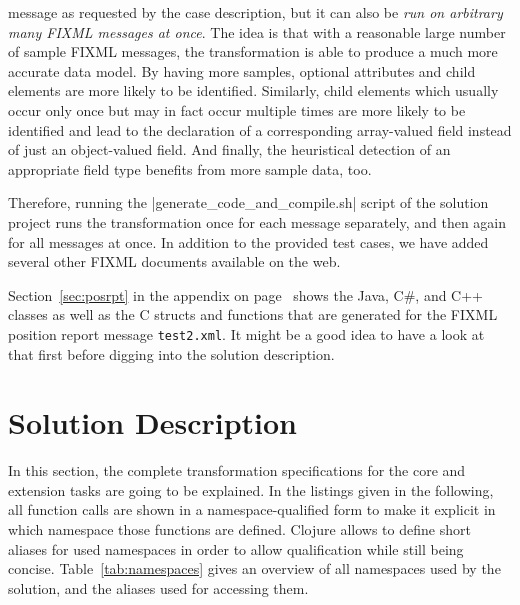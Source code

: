 \documentclass[a4paper]{article}
\newcommand{\code}{\clojureinline}
\begin{document}
\begin{compactenum}
  message as requested by the case description, but it can also be \emph{run on
    arbitrary many FIXML messages at once}.  The idea is that with a reasonable
  large number of sample FIXML messages, the transformation is able to produce
  a much more accurate data model.  By having more samples, optional attributes
  and child elements are more likely to be identified.  Similarly, child
  elements which usually occur only once but may in fact occur multiple times
  are more likely to be identified and lead to the declaration of a
  corresponding array-valued field instead of just an object-valued field.  And
  finally, the heuristical detection of an appropriate field type benefits from
  more sample data, too.

  Therefore, running the \code|generate_code_and_compile.sh| script of the
  solution project runs the transformation once for each message separately,
  and then again for all messages at once.  In addition to the provided test
  cases, we have added several other FIXML documents available on the web.
\end{compactenum}

Section~\ref{sec:posrpt} in the appendix on page~\pageref{sec:posrpt} shows the
Java, C\#, and C++ classes as well as the C structs and functions that are
generated for the FIXML position report message \texttt{test2.xml}.  It might
be a good idea to have a look at that first before digging into the solution
description.


\section{Solution Description}
\label{sec:solution-description}

In this section, the complete transformation specifications for the core and
extension tasks are going to be explained.  In the listings given in the
following, all function calls are shown in a namespace-qualified form to make
it explicit in which namespace those functions are defined.  Clojure allows to
define short aliases for used namespaces in order to allow qualification while
still being concise.  Table~\ref{tab:namespaces} gives an overview of all
namespaces used by the solution, and the aliases used for accessing them.
\end{document}
